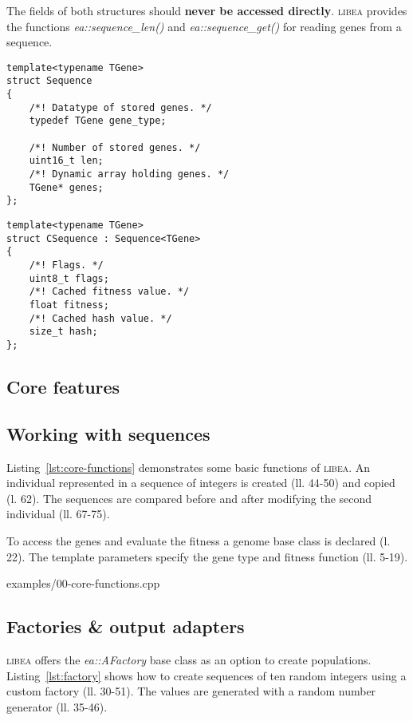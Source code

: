 \documentclass[a4paper]{article}
\begin{document}
The fields of both structures should \textbf{never be accessed directly}. \textsc{libea} provides the functions \textit{ea::sequence\_len()} and \textit{ea::sequence\_get()} for reading genes from a sequence.

\begin{lstlisting}[caption=Sequence template declaration, label=lst:sequence]
template<typename TGene>
struct Sequence
{
	/*! Datatype of stored genes. */
	typedef TGene gene_type;

	/*! Number of stored genes. */
	uint16_t len;
	/*! Dynamic array holding genes. */
	TGene* genes;
};
\end{lstlisting}

\begin{lstlisting}[caption=CSequence template declaration, label=lst:csequence]
template<typename TGene>
struct CSequence : Sequence<TGene>
{
	/*! Flags. */
	uint8_t flags;
	/*! Cached fitness value. */
	float fitness;
	/*! Cached hash value. */
	size_t hash;
};
\end{lstlisting}

\subsection{Core features}

\subsection{Working with sequences}

Listing~\ref{lst:core-functions} demonstrates some basic functions of \textsc{libea}. An individual represented in a sequence of integers is created (ll. 44-50) and copied (l. 62). The sequences are compared before and after modifying the second individual (ll. 67-75).

To access the genes and evaluate the fitness a genome base class is declared (l. 22). The template parameters specify the gene type and fitness function (ll. 5-19).

\begin{lstinputlisting}[caption=core functions,label=lst:core-functions]{examples/00-core-functions.cpp}
\end{lstinputlisting}

\subsection{Factories \& output adapters}

\textsc{libea} offers the \textit{ea::AFactory} base class as an option to create populations. Listing~\ref{lst:factory} shows how to create sequences of ten random integers using a custom factory (ll. 30-51). The values are generated with a random number generator (ll. 35-46).
\end{document}

